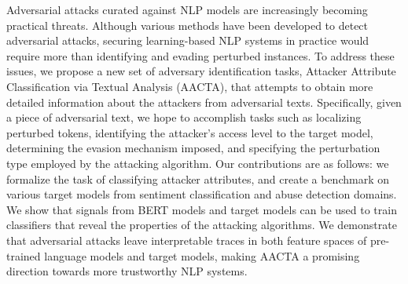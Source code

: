 Adversarial attacks curated against NLP models are increasingly becoming practical threats. Although various methods have been developed to detect adversarial attacks, securing learning-based NLP systems in practice would require more than identifying and evading perturbed instances. To address these issues, we propose a new set of adversary identification tasks, Attacker Attribute Classification via Textual Analysis  (AACTA), that attempts to obtain more detailed information about the attackers from adversarial texts. Specifically, given a piece of adversarial text, we hope to accomplish tasks such as localizing perturbed tokens, identifying the attacker's access level to the target model, determining the evasion mechanism imposed, and specifying the perturbation type employed by the attacking algorithm. Our contributions are as follows: we formalize the task of classifying attacker attributes, and create a benchmark on various target models from sentiment classification and abuse detection domains. We show that signals from BERT models and target models can be used to train classifiers that reveal the properties of the attacking algorithms. We demonstrate that adversarial attacks leave interpretable traces in both feature spaces of pre-trained language models and target models, making AACTA a promising direction towards more trustworthy NLP systems.
